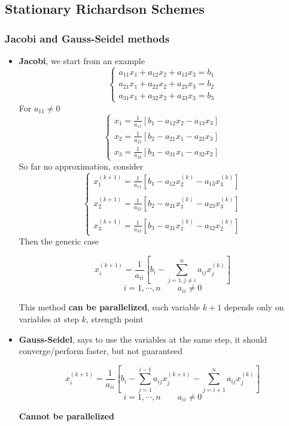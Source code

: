 \subsection{Stationary Richardson Schemes}
    \subsubsection{Jacobi and Gauss-Seidel methods}
    \begin{itemize}
        \item \textbf{Jacobi}, we start from an example
        $$
        \begin{cases}
            a_{11}x_1+a_{12}x_2+a_{13}x_3=b_1\\
            a_{21}x_1+a_{22}x_2+a_{23}x_3=b_2\\
            a_{31}x_1+a_{32}x_2+a_{33}x_3=b_3
        \end{cases}
        $$
        For $a_{11}\neq 0$
        $$
        \begin{cases}
            x_1=\frac{1}{a_{11}}\left[b_1-a_{12}x_2-a_{13}x_3\right]\\
            x_2=\frac{1}{a_{22}}\left[b_2-a_{21}x_1-a_{23}x_3\right]\\
            x_3=\frac{1}{a_{33}}\left[b_3-a_{31}x_1-a_{32}x_2\right]
        \end{cases}
        $$
        So far no approximation, consider
        $$
        \begin{cases}
            x_1^{(k+1)}=\frac{1}{a_{11}}\left[b_1-a_{12}x_2^{(k)}-a_{13}x_3^{(k)}\right]\\
            \\
            x_2^{(k+1)}=\frac{1}{a_{22}}\left[b_2-a_{21}x_1^{(k)}-a_{23}x_3^{(k)}\right]\\
            \\
            x_3^{(k+1)}=\frac{1}{a_{33}}\left[b_3-a_{31}x_1^{(k)}-a_{32}x_2^{(k)}\right]
        \end{cases}
        $$
        Then the generic case
        \begin{LARGE}
            $$
            x_i^{(k+1)}=\frac{1}{a_{ii}}\left[
                b_i-\sum_{j=1,j\neq i}^n a_{ij}x_j^{(k)}
            \right]
            $$
            $$
            i=1,\cdots,n\qquad a_{ii}\neq 0
            $$
        \end{LARGE}
        This method \textbf{can be parallelized}, each variable $k+1$ depends only on variables at step $k$, strength point
        \item \textbf{Gauss-Seidel}, says to use the variables at the same step, it should converge/perform faster, but not guaranteed
        \begin{LARGE}
            $$
            x_i^{(k+1)}=\frac{1}{a_{ii}}
            \left[
                b_i
                -\sum_{j=1}^{i-1} a_{ij}x_j^{(k+1)}
                -\sum_{j=i+1}^n a_{ij}x_j^{(k)}
            \right]
            $$
            $$
            i=1,\cdots,n\qquad a_{ii}\neq 0
            $$
        \end{LARGE}
        \textbf{Cannot be parallelized}
    \end{itemize}

